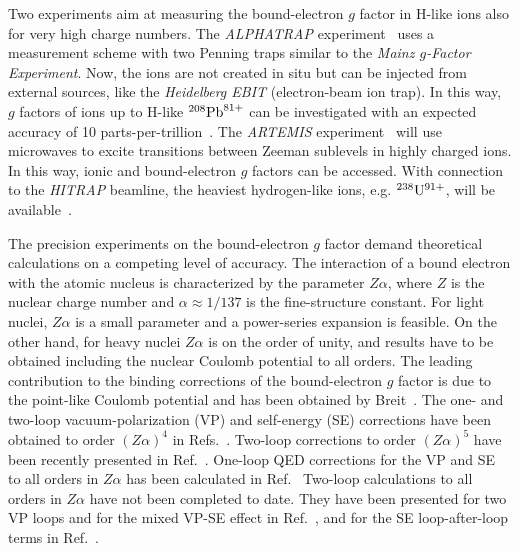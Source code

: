 Two experiments aim at measuring the bound-electron $g$ factor in H-like ions also for very high charge numbers. The \textit{ALPHATRAP} experiment~\cite{sturm2017} uses a measurement scheme with two Penning traps similar to the \textit{Mainz $g$-Factor Experiment}. Now, the ions are not created in situ but can be injected from external sources, like the \textit{Heidelberg EBIT} (electron-beam ion trap). In this way, $g$ factors of ions up to H-like $^{208}\rm{Pb}^{81+}$ can be investigated with an expected accuracy of 10 parts-per-trillion~\cite{sturm2017}. The \textit{ARTEMIS} experiment~\cite{vogel2013,sturm2017} will use microwaves to excite transitions between Zeeman sublevels in highly charged ions. In this way, ionic and bound-electron $g$ factors can be accessed. With connection to the \textit{HITRAP} beamline, the heaviest hydrogen-like ions, e.g. $^{238}\rm{U}^{91+}$, will be available~\cite{vogel2015}.

The precision experiments on the bound-electron $g$ factor demand theoretical calculations on a competing level of accuracy. The interaction of a bound electron with the atomic nucleus is characterized by the parameter $Z\alpha$, where $Z$ is the nuclear charge number and $\alpha \approx 1/137$ is the fine-structure constant. For light nuclei, $Z\alpha$ is a small parameter and a power-series expansion is feasible. On the other hand, for heavy nuclei $Z\alpha$ is on the order of unity, and results have to be obtained including the nuclear Coulomb potential to all orders. %
The leading contribution to the binding corrections of the bound-electron $g$ factor is due to the point-like Coulomb potential and has been obtained by Breit~\cite{breit1928}.
The one- and two-loop vacuum-polarization (VP) and self-energy (SE) corrections have been obtained to order $(Z\alpha)^4$ in Refs.~\cite{karshenboim2000,Pachucki2004,pachucki2004_err,Pachucki2005,czarnecki2016}. 
Two-loop corrections to order $(Z\alpha)^5$ have been recently presented in Ref.~\cite{czarnecki2018}.
One-loop QED corrections for the VP and SE to all orders in $Z\alpha$ has been calculated in Ref.~\cite{Beier2000,Karshenboim2001,yerokhin2002,Yerokhin2004,Lee2005,Lee2007,yerokhin2008,yerokhin2010,yerokhin2017}
Two-loop calculations to all orders in $Z\alpha$ have not been completed to date. They have been presented for two VP loops and for the mixed VP-SE effect in Ref.~\cite{yerokhin2013}, and for the SE loop-after-loop terms in Ref.~\cite{sikora2018_arxiv}.

